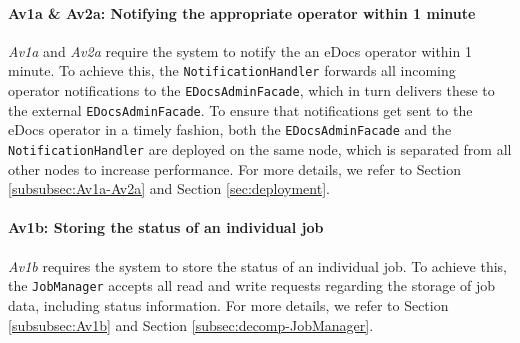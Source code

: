 \documentclass[a4paper,10pt]{article}
\begin{document}
\paragraph{Av1a \& Av2a\@: Notifying the appropriate operator within 1 minute}
\textit{Av1a} and \textit{Av2a} require the system to notify the an eDocs operator within 1 minute. To achieve this, the \texttt{NotificationHandler} forwards all incoming operator notifications to the \texttt{EDocsAdminFacade}, which in turn delivers these to the external \texttt{EDocsAdminFacade}. To ensure that notifications get sent to the eDocs operator in a timely fashion, both the \texttt{EDocsAdminFacade} and the \texttt{NotificationHandler} are deployed on the same node, which is separated from all other nodes to increase performance. For more details, we refer to Section \ref{subsubsec:Av1a-Av2a} and Section \ref{sec:deployment}.

\paragraph{Av1b\@: Storing the status of an individual job}
\textit{Av1b} requires the system to store the status of an individual job. To achieve this, the \texttt{JobManager} accepts all read and write requests regarding the storage of job data, including status information. For more details, we refer to Section \ref{subsubsec:Av1b} and Section \ref{subsec:decomp-JobManager}.
\end{document}
